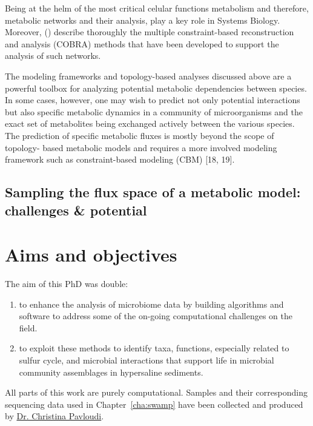      Being at the helm of the most critical celular functions  
      metabolism and therefore, metabolic networks and their analysis, 
      play a key role in Systems Biology. 
      Moreover, \citeauthor{lewis2012constraining} (\citeyear{lewis2012constraining}) 
      describe thoroughly the multiple constraint-based reconstruction and analysis (COBRA) methods 
      that have been developed to support the analysis of such networks. 


      The modeling frameworks and topology-based analyses discussed above are a
      powerful toolbox for analyzing potential metabolic dependencies between species.
      In some cases, however, one may wish to predict not only potential interactions
      but also specific metabolic dynamics in a community of microorganisms and the
      exact set of metabolites being exchanged actively between the various species. The
      prediction of specific metabolic fluxes is mostly beyond the scope of topology-
      based metabolic models and requires a more involved modeling framework such
      as constraint-based modeling (CBM) [18, 19]. 





   \subsection{Sampling the flux space of a metabolic model: challenges \& potential}



   \fi



\section{Aims and objectives}

   The aim of this PhD was double:
   \begin{enumerate}
      \item to enhance the analysis of microbiome data by building algorithms and software 
            to address some of the on-going computational challenges on the field.
      \item to exploit these methods to identify taxa, functions, especially related to sulfur cycle, 
            and microbial interactions that support life in microbial community assemblages in hypersaline sediments.
   \end{enumerate}
   All parts of this work are purely computational. 
   Samples and their corresponding sequencing data used in Chapter~\ref{cha:swamp} have been collected 
   and produced by \href{https://scholar.google.com/citations?user=3zs1rNkAAAAJ&hl=en&oi=sra}{Dr. Christina Pavloudi}. 

